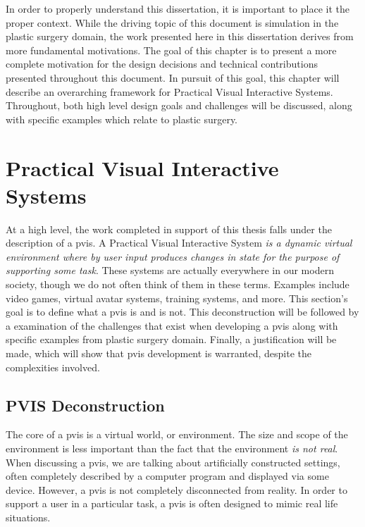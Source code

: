 \documentclass[12pt,oneside,letterpaper]{memoir}
\begin{document}
In order to properly understand this dissertation, it is important to
place it the proper context. While the driving topic of this document
is simulation in the plastic surgery domain, the work presented here
in this dissertation derives from more fundamental motivations. The
goal of this chapter is to present a more complete motivation for the
design decisions and technical contributions presented throughout this
document.  In pursuit of this goal, this chapter will describe an
overarching framework for Practical Visual Interactive
Systems. Throughout, both high level design goals and challenges will
be discussed, along with specific examples which relate to plastic surgery.


\section{Practical Visual Interactive Systems}


At a high level, the work completed in support of this thesis falls under the description
of a \Gls{pvis}. A Practical Visual Interactive System \textit{is a dynamic
virtual environment where by user input produces changes in state for
the purpose of supporting some task}. These systems are actually
everywhere in our modern society, though we do not often think
of them in these terms. Examples include video games, virtual avatar
systems, training systems, and more. This section's goal is to define
what a \gls{pvis} is and is not. This deconstruction will be followed
by a examination of the challenges that exist when developing a
\gls{pvis} along with specific examples from plastic surgery
domain. Finally, a justification will be made, which will show that
\gls{pvis} development is warranted, despite the complexities involved.

\subsection{PVIS Deconstruction}

The core of a \gls{pvis} is a virtual world, or environment. The size
and scope of the environment is less important than the fact that the
environment \textit{is not real}. When discussing a \gls{pvis}, we are
talking about artificially constructed settings, often completely
described by a computer program and displayed via some
device. However, a \gls{pvis} is not completely disconnected from
reality. In order to support a user in a particular task, a \gls{pvis}
is often designed to mimic real life situations.
\end{document}
